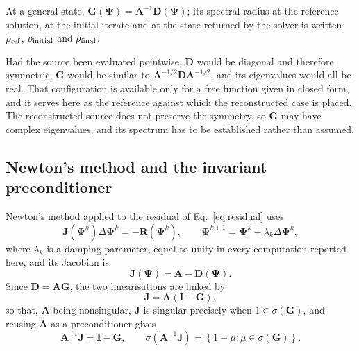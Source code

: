 At a general state, $\mathbf{G}(\bm{\Psi})=\mathbf{A}^{-1}\mathbf{D}(\bm{\Psi})$; its spectral radius at the reference solution, at the initial iterate and at the state returned by the solver is written $\rho_{\rm ref}$, $\rho_{\rm initial}$ and $\rho_{\rm final}$.

Had the source been evaluated pointwise, $\mathbf{D}$ would be diagonal and therefore symmetric, $\mathbf{G}$ would be similar to $\mathbf{A}^{-1/2}\mathbf{D}\mathbf{A}^{-1/2}$, and its eigenvalues would all be real. That configuration is available only for a free function given in closed form, and it serves here as the reference against which the reconstructed case is placed. The reconstructed source does not preserve the symmetry, so $\mathbf{G}$ may have complex eigenvalues, and its spectrum has to be established rather than assumed.

\subsection{Newton's method and the invariant preconditioner}
\label{subsec:newton_method}

Newton's meth\-od applied to the residual of Eq.~\eqref{eq:residual} uses
\begin{equation}
  \mathbf{J}(\bm{\Psi}^{k})\Delta\bm{\Psi}^{k}
  =
  -\mathbf{R}(\bm{\Psi}^{k}) ,
  \qquad
  \bm{\Psi}^{k+1}
  =
  \bm{\Psi}^{k}
  +
  \lambda_k\Delta\bm{\Psi}^{k} ,
  \label{eq:newton_iteration}
\end{equation}
where $\lambda_k$ is a damping parameter, equal to unity in every computation reported here, and its Jacobian is
\begin{equation}
  \mathbf{J}(\bm{\Psi})
  =
  \mathbf{A}
  -
  \mathbf{D}(\bm{\Psi}) .
  \label{eq:newton_jacobian}
\end{equation}
Since $\mathbf{D}=\mathbf{A}\mathbf{G}$, the two linearisations are linked by
\begin{equation}
  \mathbf{J}
  =
  \mathbf{A}\left( \mathbf{I} - \mathbf{G} \right) ,
  \label{eq:picard_newton_identity}
\end{equation}
so that, $\mathbf{A}$ being nonsingular, $\mathbf{J}$ is singular precisely when $1\in\sigma(\mathbf{G})$, and reusing $\mathbf{A}$ as a preconditioner gives
\begin{equation}
  \mathbf{A}^{-1}\mathbf{J}
  =
  \mathbf{I} - \mathbf{G} ,
  \qquad
  \sigma\!\left( \mathbf{A}^{-1}\mathbf{J} \right)
  =
  \left\{ 1-\mu : \mu \in \sigma(\mathbf{G}) \right\} .
  \label{eq:preconditioned_newton_spectrum}
\end{equation}

